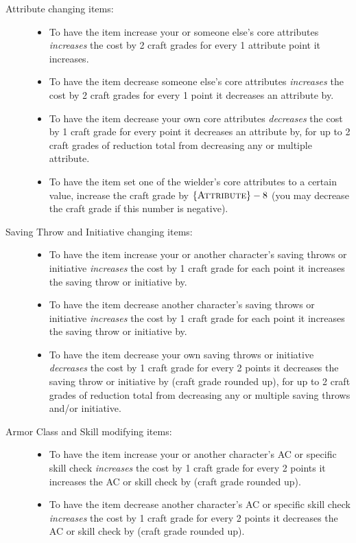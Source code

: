 \begin{description}
	\item[Attribute changing items:] \hfill
	\begin{itemize}
		\item To have the item increase your or someone else's core attributes \emph{increases} the cost by 2 craft grades for every 1 attribute point it increases.
		\item To have the item decrease someone else's core attributes \emph{increases} the cost by 2 craft grades for every 1 point it decreases an attribute by.
		\item To have the item decrease your own core attributes \emph{decreases} the cost by 1 craft grade for every point it decreases an attribute by, for up to 2 craft grades of reduction total from decreasing any or multiple attribute.
		\item To have the item set one of the wielder's core attributes to a certain value, increase the craft grade by $\{ \textsc{Attribute} \}-8$ (you may decrease the craft grade if this number is negative).
	\end{itemize}
	\item [Saving Throw and Initiative changing items:] \hfill
	\begin{itemize}
		\item To have the item increase your or another character's saving throws or initiative \emph{increases} the cost by 1 craft grade for each point it increases the saving throw or initiative by.
		\item To have the item decrease another character's saving throws or initiative \emph{increases} the cost by 1 craft grade for each point it increases the saving throw or initiative by.
		\item To have the item decrease your own saving throws or initiative \emph{decreases} the cost by 1 craft grade for every 2 points it decreases the saving throw or initiative by (craft grade rounded up), for up to 2 craft grades of reduction total from decreasing any or multiple saving throws and/or initiative.
	\end{itemize}
	\item[Armor Class and Skill modifying items:] \hfill
	\begin{itemize}
		\item To have the item increase your or another character's AC or specific skill check \emph{increases} the cost by 1 craft grade for every 2 points it increases the AC or skill check by (craft grade rounded up).
		\item To have the item decrease another character's AC or specific skill check \emph{increases} the cost by 1 craft grade for every 2 points it decreases the AC or skill check by (craft grade rounded up).

\end{itemize}
\end{description}
